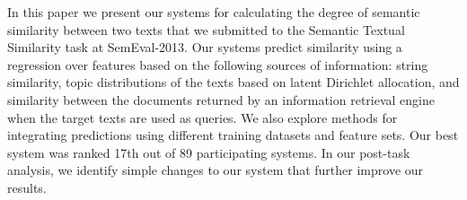 In this paper we present our systems for calculating the degree of semantic similarity between two texts that we submitted to the Semantic Textual
 Similarity task at SemEval-2013. Our systems predict similarity using a
 regression over features based on the following sources of information: 
 string similarity, topic distributions of the texts based on latent Dirichlet 
 allocation, and similarity between the documents returned by an information 
 retrieval engine when the target texts are used as queries. We also explore
 methods for integrating predictions using different training
 datasets and feature sets. Our best system was ranked 17th out of 89 
 participating systems. In our post-task analysis, we identify simple changes to
 our system that further improve our results.

